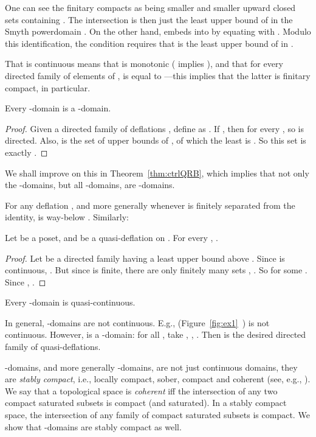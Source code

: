 \documentclass{LMCS}
\begin{document}
One can see the finitary compacts  as being smaller and
smaller upward closed sets containing .  The intersection
 is then just the least
upper bound of  in the Smyth
powerdomain .  On the other hand,  embeds into  by equating  with .  Modulo this
identification, the condition  requires that  is the least upper bound of  in .

That  is continuous means that  is monotonic ( implies ), and that for
every directed family  of elements of ,  is equal to ---this implies that the latter is finitary compact, in
particular.

\begin{prop}
  \label{prop:FS:QRB}
  Every -domain is a -domain.
\end{prop}
\begin{proof}
  Given a directed family of deflations ,
  define  as .  If , then
   for every , so
   is directed.  Also,  is the set of upper bounds of
  , of which the least is .  So this set is
  exactly .
\end{proof}
We shall improve on this in Theorem~\ref{thm:ctrlQRB}, which implies
that not only the -domains, but all -domains, are
-domains.







For any deflation , and more generally whenever  is finitely
separated from the identity,  is way-below 
\cite[Lemma~II-2.16]{GHKLMS:contlatt}.  Similarly:
\begin{lem}
  \label{lemma:qdefl:ll}
  Let  be a poset, and  be a quasi-deflation on .  For
  every , .
\end{lem}
\begin{proof}
  Let  be a directed family having a least upper
  bound above .  Since  is continuous, .  But since
   is finite, there are only finitely many sets , .  So  for
  some .  Since , .
\end{proof}

\begin{cor}
  \label{corl:qrb:qcont}
  Every -domain is quasi-continuous.
\end{cor}
In general, -domains are not continuous.  E.g., 
(Figure~\ref{fig:ex1}~) is not continuous.  However,  is a -domain: for all , take , , .  Then
 is the desired directed family of
quasi-deflations.

-domains, and more generally -domains, are not just
continuous domains, they are {\em stably compact\/}, i.e., locally
compact, sober, compact and coherent (see, e.g.,
\cite[Theorem~4.2.18]{AJ:domains}).  We say that a topological space
is {\em coherent\/} iff the intersection of any two compact saturated
subsets is compact (and saturated).  In a stably compact space, the
intersection of any family of compact saturated subsets is compact.
We show that -domains are stably compact as well.
\end{document}
